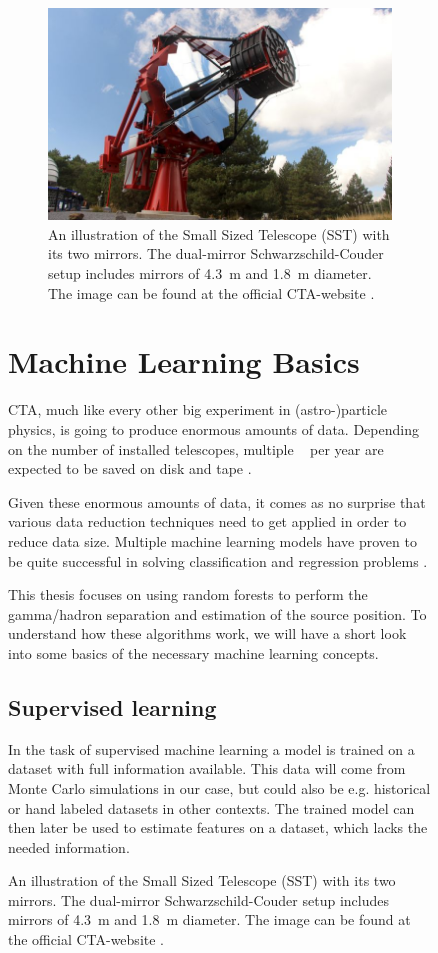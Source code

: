 \begin{figure}
\begin{figure}
	\center
	\captionsetup{width=0.9\linewidth}
	\includegraphics[width=.9\textwidth]{images/sst.jpg}
	\caption{An illustration of the Small Sized Telescope (SST) with its
	two mirrors.
	The dual-mirror Schwarzschild-Couder setup includes mirrors of
	\SI{4.3}{\meter} and \SI{1.8}{\meter} diameter.
	The image can be found at the official CTA-website \cite{cta_web}.}
	\label{fig:sst}
\end{figure}


\chapter{Machine Learning Basics}
\label{ml}

CTA, much like every other big experiment in (astro-)particle physics,
is going to produce enormous amounts of data.
Depending on the number of installed telescopes, multiple
\si{\peta\byte} per year are expected to be saved
on disk and tape \cite{lamanna2015cherenkov}.

Given these enormous amounts of data, it comes as no surprise that
various data reduction techniques need to get applied in
order to reduce data size.
Multiple machine learning models have proven to be
quite successful in solving classification and
regression problems
\cite{bigdata_astronomy}.

This thesis focuses on using random forests to
perform the gamma/hadron separation
and estimation of the source position.
To understand how these algorithms work, we will
have a short look into some basics
of the necessary machine learning concepts.

\section{Supervised learning}
In the task of supervised machine learning a model is trained on a
dataset with full information available.
This data will come from Monte Carlo simulations in our case, but
could also be e.g. historical or hand labeled datasets in other contexts.
The trained model can then later be used to estimate features on a dataset, which
lacks the needed information.


\end{figure}
